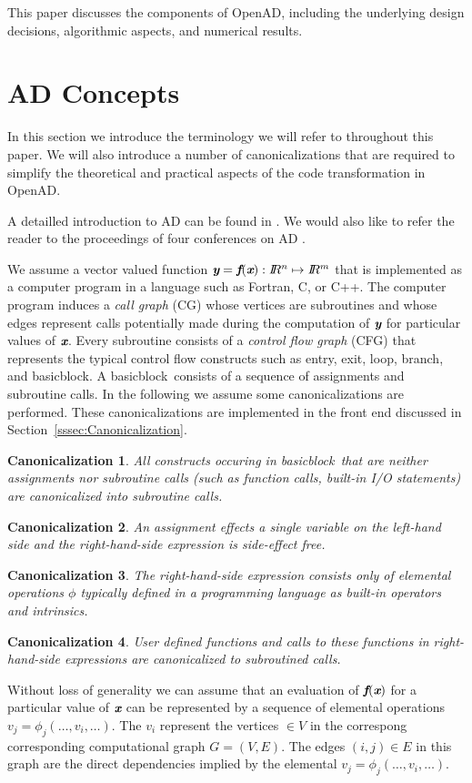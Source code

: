\documentclass[acmtocl,acmnow]{acmtrans2m}
\newcommand{\entry}{entry}
\newcommand{\exit}{exit}
\newcommand{\Loop}{loop}
\newcommand{\branch}{branch}
\newcommand{\basicblock}{basicblock}
\newcommand{\OpenAD}{OpenAD}
\newcommand{\R}{I\!\!R}
\newcommand{\bmf}{\mbox{\bf\em f}}
\newcommand{\bmx}{\mbox{\bf\em x}}
\newcommand{\bmy}{\mbox{\bf\em y}}
\newcommand{\refsec}[1]{Section~\ref{#1}}
\newtheorem{Can}{Canonicalization}
\begin{document}
This paper discusses the components of \OpenAD,
including the underlying design decisions, algorithmic aspects, and
numerical results.
 
\section{AD Concepts}\label{sec:ADIntro}

In this section we introduce the terminology we will refer to throughout 
this paper. We will also introduce a number of canonicalizations 
that are required to simplify the theoretical and practical 
aspects of the code transformation in \OpenAD.

A detailled introduction to AD can be found in \cite{Gri00}. 
We would also like to refer the reader to the proceedings of four conferences 
on AD \cite{CG91,BBCG96,CFG+01,BCH+05}.

We assume a vector valued function $\bmy=\bmf(\bmx): \R^n\mapsto \R^m$ that is implemented 
as a computer program in a language such as Fortran, C, or C++. 
The computer program 
induces a {\em call graph} (CG) \cite{Aho}
whose vertices are subroutines and whose edges 
represent calls potentially made during the computation of $\bmy$ for particular 
values of $\bmx$. 
Every subroutine consists of a {\em control flow graph} (CFG) that 
represents the typical control flow constructs such as \entry, \exit, \Loop, \branch, 
and \basicblock. 
A \basicblock\ consists of a sequence of assignments and subroutine calls. 
In the following we assume some canonicalizations are performed. 
These canonicalizations are implemented in the front end discussed in 
\refsec{sssec:Canonicalization}.
\begin{Can} \label{can:funcToSub}
All constructs occuring in \basicblock\ that are neither assignments nor subroutine calls (such as function calls, built-in I/O statements) 
are canonicalized into subroutine calls.
\end{Can}
\begin{Can} \label{can:assignSideEffectFree}
An assignment effects a single variable on the left-hand side and 
the right-hand-side expression is side-effect free.
\end{Can}
\begin{Can} \label{can:assignElemental}
The right-hand-side expression consists only of elemental operations $\phi$ typically 
defined in a programming language as built-in operators and intrinsics.
\end{Can}
\begin{Can} \label{can:assignFunction}
User defined functions and calls to these functions in right-hand-side expressions 
are canonicalized to subroutined calls.
\end{Can}
Without loss of generality we can assume that an evaluation of $\bmf(\bmx)$ for  
a particular value of $\bmx$ can be represented by a sequence of 
elemental operations $v_j=\phi_j(\ldots,v_i,\ldots)$. 
The $v_i$ represent the vertices $\in V$ in the correspong corresponding computational 
graph $G=(V,E)$. The edges $(i,j)\in E$ in this graph are the direct dependencies 
implied by the elemental $v_j=\phi_j(\ldots,v_i,\ldots)$.
\end{document}
